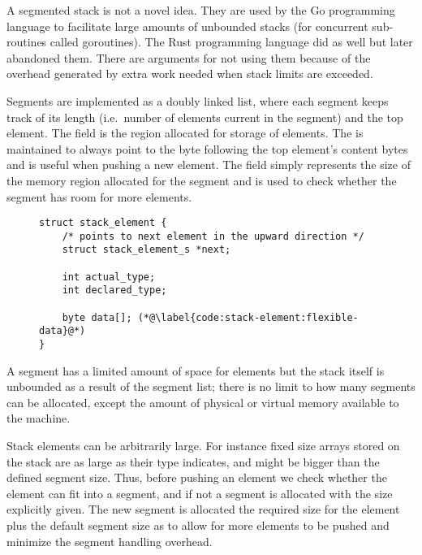 \begin{remark}
  A segmented stack is not a novel idea. They are used by the Go programming
  language to facilitate large amounts of unbounded stacks (for concurrent
  sub-routines called goroutines). The Rust programming language did as well but
  later abandoned them. There are arguments for not using them because of the
  overhead generated by extra work needed when stack limits are
  exceeded\cite{rust:segmented-stack, go:segmented-stack}.
\end{remark}

Segments are implemented as a doubly linked list, where each segment keeps track
of its length (i.e.~number of elements current in the segment) and the top
element. The  field is the region allocated for storage of
elements. The  is maintained to always point to the byte
following the top element's content bytes and is useful when pushing a new
element. The  field simply represents the size of the memory region
allocated for the segment and is used to check whether the segment has room for
more elements.

\begin{figure}[h]
  \centering
  \begin{lstlisting}[language={[ANSI]C},%
    caption={Structure defining the stack},%
    label={lst:implementation:stack:element}]
struct stack_element {
    /* points to next element in the upward direction */
    struct stack_element_s *next;

    int actual_type;
    int declared_type;

    byte data[]; (*@\label{code:stack-element:flexible-data}@*)
}
  \end{lstlisting}
\end{figure}

A segment has a limited amount of space for elements but the stack itself is
unbounded as a result of the segment list; there is no limit to how many
segments can be allocated, except the amount of physical or virtual memory
available to the machine.

Stack elements can be arbitrarily large. For instance fixed size arrays stored
on the stack are as large as their type indicates, and might be bigger than the
defined segment size. Thus, before pushing an element we check whether the
element can fit into a segment, and if not a segment is allocated with the size
explicitly given. The new segment is allocated the required size for the element
plus the default segment size as to allow for more elements to be pushed and
minimize the segment handling overhead.

